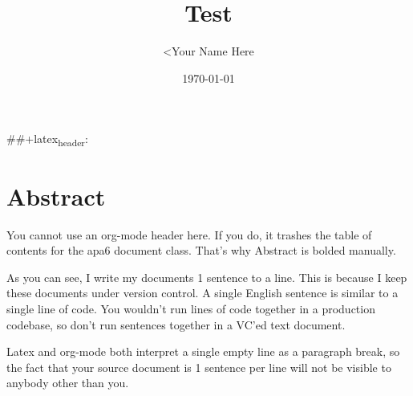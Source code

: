 \documentclass[11pt]{article}
\author{<Your Name Here}
\date{\today}
\title{Test}
\begin{document}
\maketitle
\tableofcontents

\#\#+latex\textsubscript{header}: \usepackage[english]{babel}

\section{Abstract}
\label{sec:orgd40a121}

You cannot use an org-mode header here.
If you do, it trashes the table of contents for the apa6 document class.
That's why Abstract is bolded manually.

As you can see, I write my documents 1 sentence to a line.
This is because I keep these documents under version control.
A single English sentence is similar to a single line of code.
You wouldn't run lines of code together in a production codebase, so don't run sentences together in a VC'ed text document.

Latex and org-mode both interpret a single empty line as a paragraph break, so the fact that your source document is 1 sentence per line will not be visible to anybody other than you.

\cite{devlin2019}
\printbibliography
\end{document}
